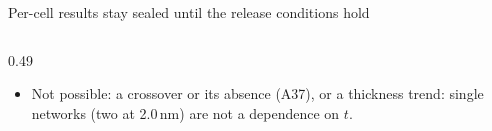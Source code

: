 \begin{frame}{Per-cell results stay sealed until the release conditions hold}
\begin{columns}[T,onlytextwidth]
\begin{column}{0.49\textwidth}
      \vspace{0.4mm}
      \begin{itemize}
        \item Not possible: a crossover or its absence (A37), or a thickness trend: single networks (two at
          2.0\,nm) are not a dependence on $t$.
      \end{itemize}
    \end{column}
  \end{columns}
\end{frame}
